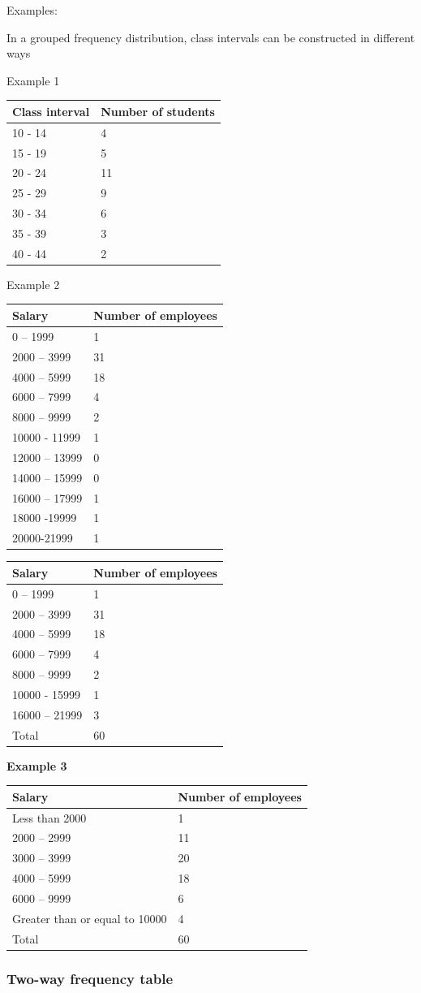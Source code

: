 \documentclass[]{book}
\begin{document}
Examples:

In a grouped frequency distribution, class intervals can be constructed in different ways

Example 1

\begin{longtable}[]{@{}ll@{}}
\toprule
Class interval & Number of students\tabularnewline
\midrule
\endhead
10 - 14 & 4\tabularnewline
15 - 19 & 5\tabularnewline
20 - 24 & 11\tabularnewline
25 - 29 & 9\tabularnewline
30 - 34 & 6\tabularnewline
35 - 39 & 3\tabularnewline
40 - 44 & 2\tabularnewline
\bottomrule
\end{longtable}

Example 2

\begin{longtable}[]{@{}ll@{}}
\toprule
Salary & Number of employees\tabularnewline
\midrule
\endhead
0 -- 1999 & 1\tabularnewline
2000 -- 3999 & 31\tabularnewline
4000 -- 5999 & 18\tabularnewline
6000 -- 7999 & 4\tabularnewline
8000 -- 9999 & 2\tabularnewline
10000 - 11999 & 1\tabularnewline
12000 -- 13999 & 0\tabularnewline
14000 -- 15999 & 0\tabularnewline
16000 -- 17999 & 1\tabularnewline
18000 -19999 & 1\tabularnewline
20000-21999 & 1\tabularnewline
\bottomrule
\end{longtable}

\begin{longtable}[]{@{}ll@{}}
\toprule
Salary & Number of employees\tabularnewline
\midrule
\endhead
0 -- 1999 & 1\tabularnewline
2000 -- 3999 & 31\tabularnewline
4000 -- 5999 & 18\tabularnewline
6000 -- 7999 & 4\tabularnewline
8000 -- 9999 & 2\tabularnewline
10000 - 15999 & 1\tabularnewline
16000 -- 21999 & 3\tabularnewline
Total & 60\tabularnewline
\bottomrule
\end{longtable}

\textbf{Example 3}

\begin{longtable}[]{@{}ll@{}}
\toprule
Salary & Number of employees\tabularnewline
\midrule
\endhead
Less than 2000 & 1\tabularnewline
2000 -- 2999 & 11\tabularnewline
3000 -- 3999 & 20\tabularnewline
4000 -- 5999 & 18\tabularnewline
6000 -- 9999 & 6\tabularnewline
Greater than or equal to 10000 & 4\tabularnewline
Total & 60\tabularnewline
\bottomrule
\end{longtable}

\hypertarget{two-way-frequency-table}{%
\subsubsection{Two-way frequency table}\label{two-way-frequency-table}}
\end{document}
